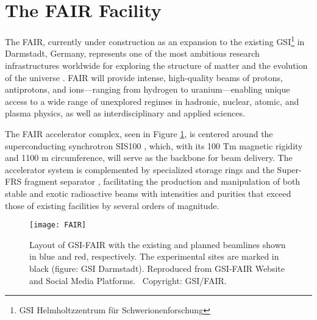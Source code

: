 \section{The FAIR Facility}


The \gls{FAIR}, currently under construction as an expansion to the existing GSI\footnote{GSI Helmholtzzentrum für Schwerionenforschung} in Darmstadt, Germany, represents one of the most ambitious research infrastructures worldwide for exploring the structure of matter and the evolution of the universe \cite{stoecker_fair_2011}. \gls{FAIR} will provide intense, high-quality beams of protons, antiprotons, and ions—ranging from hydrogen to uranium—enabling unique access to a wide range of unexplored regimes in hadronic, nuclear, atomic, and plasma physics, as well as interdisciplinary and applied sciences.

The \gls{FAIR} accelerator complex, seen in Figure \ref{fig:FAIRlayout}, is centered around the superconducting synchrotron SIS100 \cite{sis100_fair_2020}, which, with its 100 Tm magnetic rigidity and 1100 m circumference, will serve as the backbone for beam delivery. The accelerator system is complemented by specialized storage rings and the Super-FRS fragment separator \cite{superfrs_status_2008}, facilitating the production and manipulation of both stable and exotic radioactive beams with intensities and purities that exceed those of existing facilities by several orders of magnitude.

\begin{figure}[]
	\centering
	\texttt{[image: FAIR]}
	\caption[Layout of GSI-FAIR with existing and planned beamlines]{Layout of GSI-FAIR with the existing and planned beamlines shown in blue and red, respectively. The experimental sites are marked in black (figure: GSI Darmstadt). Reproduced from GSI-FAIR Website and Social Media Platforms. \textcopyright ~Copyright: GSI/FAIR.}
	\label{fig:FAIRlayout}
\end{figure}

